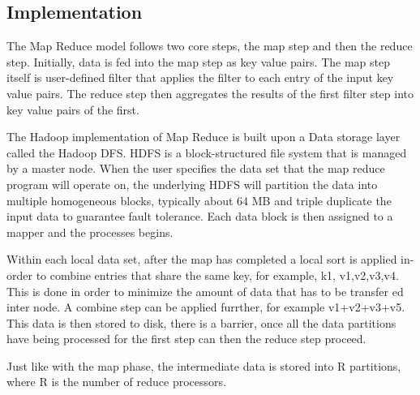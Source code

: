 \documentclass[10pt,twocolumn]{IEEEtran11}
\begin{document}
\subsection{Implementation}
The Map Reduce model follows two core steps, the map step and then the reduce step.  Initially, data is fed into the map step as key value pairs.  The map step itself is user-defined filter that applies the filter to each entry of the input key value pairs.  The reduce step then aggregates the results of the first filter step into key value pairs of the first.
\par
The Hadoop implementation of Map Reduce is built upon a Data storage layer called the Hadoop DFS.  HDFS is a block-structured file system that is managed by a master node.  When the user specifies the data set that the map reduce program will operate on, the underlying HDFS will partition the data into multiple homogeneous blocks, typically about 64 MB and triple duplicate the input data to guarantee fault tolerance.  Each data block is then assigned to a mapper and the processes begins.
\par
Within each local data set, after the map has completed a local sort is applied in-order to combine entries that share the same key, for example, {k1, v1,v2,v3,v4}.  This is done in order to minimize the amount of data that has to be transfer ed inter node. A combine step can be applied furrther, for example v1+v2+v3+v5.  This data is then stored to disk, there is a barrier, once all the data partitions have being processed for the first step can then the reduce step proceed.  
\par
Just like with the map phase, the intermediate data is stored into R partitions, where R is the number of reduce processors.
\end{document}
